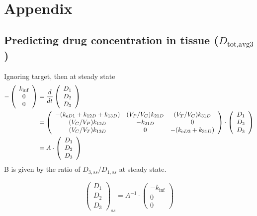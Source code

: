\section{Appendix}



\subsection{Predicting drug concentration in tissue ($D_{\text{tot,avg}3}$)}



Ignoring target, then at steady state
\begin{align*}
-\left(\begin{array}{c}
k_{\text{inf}}\\
0\\
0
\end{array}\right) &= \frac{d}{dt}\left(\begin{array}{c}
D_{1}\\
D_{2}\\
D_{3}
\end{array}\right) \\
&= \left(\begin{array}{ccc}
-(k_{\text{e} D1}+k_{12D}+k_{13D}) & (V_{P}/V_{C})k_{21D} & (V_{T}/V_{C})k_{31D}\\
(V_{C}/V_{P})k_{12D} & -k_{21D} & 0\\
(V_{C}/V_{T})k_{13D} & 0 & -(k_{\text{e} D3}+k_{31D})
\end{array}\right)\cdot\left(\begin{array}{c}
D_{1}\\
D_{2}\\
D_{3}
\end{array}\right)\\
&= A\cdot\left(\begin{array}{c}
D_{1}\\
D_{2}\\
D_{3}
\end{array}\right)
\end{align*}
B is given by the ratio of $D_{3,ss}/D_{1,ss}$ at steady state. 

\[
\left(\begin{array}{c}
D_{1}\\
D_{2}\\
D_{3}
\end{array}\right)_{ss}=A^{-1}\cdot\left(\begin{array}{c}
-k_{\text{inf}}\\
0\\
0
\end{array}\right)
\]


